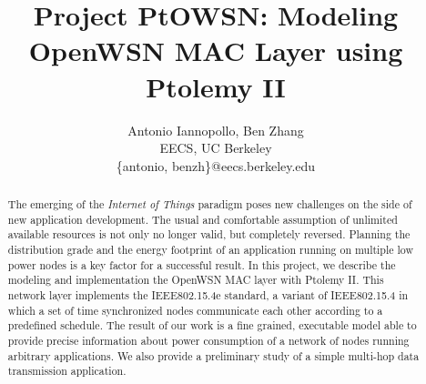 \documentclass[9pt,twocolumn]{article}
\begin{document}
\title{Project PtOWSN: Modeling OpenWSN MAC Layer using Ptolemy II}

\author{
  Antonio Iannopollo, Ben Zhang\\
  EECS, UC Berkeley\\
  \{antonio, benzh\}@eecs.berkeley.edu
}

\maketitle
\thispagestyle{empty}

\begin{abstract}
The emerging of the {\em Internet of Things} paradigm poses new challenges on the side of new application development. The usual and comfortable assumption of unlimited available resources is not only no longer valid, but completely reversed. Planning the distribution grade and the energy footprint of an application running on multiple low power nodes is a key factor for a successful result.
In this project, we describe the modeling and implementation the OpenWSN MAC layer with Ptolemy II. This network layer implements the IEEE802.15.4e standard, a variant of IEEE802.15.4 in which a set of time synchronized nodes communicate each other according to a predefined schedule. 
The result of our work is a fine grained, executable model able to provide precise information about power consumption of a network of nodes running arbitrary applications. We also provide a preliminary study of a simple multi-hop data transmission application.
\end{abstract}








{\footnotesize }


\end{document}
